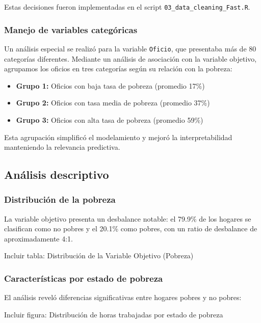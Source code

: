 \documentclass[12pt,a4paper,onecolumn]{article}
\begin{document}
Estas decisiones fueron implementadas en el script \texttt{03\_data\_cleaning\_Fast.R}.

\subsubsection{Manejo de variables categóricas}

Un análisis especial se realizó para la variable \texttt{Oficio}, que presentaba más de 80 categorías diferentes. Mediante un análisis de asociación con la variable objetivo, agrupamos los oficios en tres categorías según su relación con la pobreza:
\begin{itemize}
    \item \textbf{Grupo 1:} Oficios con baja tasa de pobreza (promedio 17\%)
    \item \textbf{Grupo 2:} Oficios con tasa media de pobreza (promedio 37\%)
    \item \textbf{Grupo 3:} Oficios con alta tasa de pobreza (promedio 59\%)
\end{itemize}

Esta agrupación simplificó el modelamiento y mejoró la interpretabilidad manteniendo la relevancia predictiva.

\subsection{Análisis descriptivo}

\subsubsection{Distribución de la pobreza}

La variable objetivo presenta un desbalance notable: el 79.9\% de los hogares se clasifican como no pobres y el 20.1\% como pobres, con un ratio de desbalance de aproximadamente 4:1.

{\color{blue} Incluir tabla: Distribución de la Variable Objetivo (Pobreza)}

\subsubsection{Características por estado de pobreza}

El análisis reveló diferencias significativas entre hogares pobres y no pobres:

{\color{blue} Incluir figura: Distribución de horas trabajadas por estado de pobreza}
\end{document}

